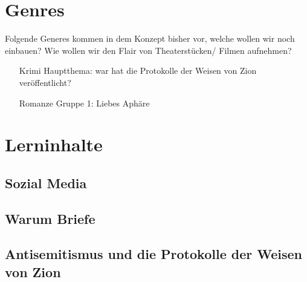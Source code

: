 \documentclass[12pt, a4paper, openany]{report}
\begin{document}
\chapter{Genres}
Folgende Generes kommen in dem Konzept bisher vor, welche wollen wir noch einbauen? 
Wie wollen wir den Flair von Theaterstücken/ Filmen aufnehmen?
\begin{itemize}
    \item[Krimi] Hauptthema: war hat die Protokolle der Weisen von Zion veröffentlicht?
    \item[Romanze] Gruppe 1: Liebes Aphäre
\end{itemize}

\chapter{Lerninhalte}
\section{Sozial Media}
\section{Warum Briefe}
\section{Antisemitismus und die Protokolle der Weisen von Zion}

\printbibliography
\listoftodos
\end{document}
